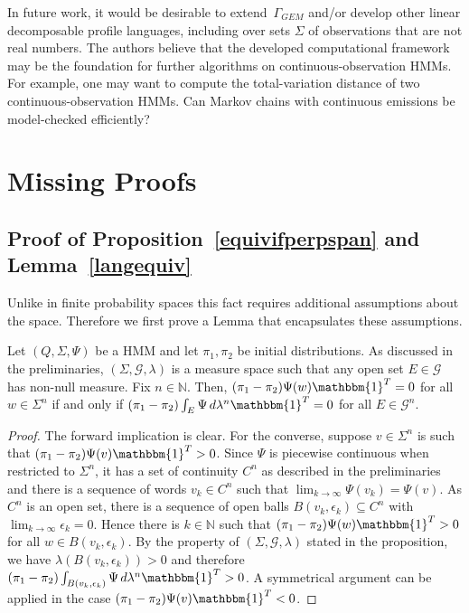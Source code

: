 \documentclass[a4paper,UKenglish,cleveref, autoref,mathscr]{lipics-v2019}
\newcommand{\NN}{\mathbb{N}}
\newcommand{\GG}{\mathscr{G}}
\newcommand{\1}{\mathbbm{1}}
\newcommand{\pl}{\Gamma_{\mathit{GEM}}}
\begin{document}
In future work, it would be desirable to extend~$\pl$ and/or develop other linear decomposable profile languages, including over sets $\Sigma$ of observations that are not real numbers.
The authors believe that the developed computational framework may be the foundation for further algorithms on continuous-observation HMMs.
For example, one may want to compute the total-variation distance of two continuous-observation HMMs.
Can Markov chains with continuous emissions be model-checked efficiently?



\appendix

\section{Missing Proofs}\label{alternants}

\subsection{Proof of Proposition~\ref{equivifperpspan} and Lemma~\ref{langequiv}}

\equivifperpspan*

Unlike in finite probability spaces this fact requires additional assumptions about the space. Therefore we first prove a Lemma that encapsulates these assumptions.

\begin{lemma}\label{pwcontinuousspanlemma}
Let $(Q, \Sigma, \Psi)$ be a HMM and let $\pi_1, \pi_2$ be initial distributions. As discussed in the preliminaries, $(\Sigma, \GG, \lambda)$ is a measure space such that any open set $E \in \GG$ has non-null measure. Fix $n \in \NN$. Then, $(\pi_1 - \pi_2) \Psi(w) \1^T = 0$ for all $w \in \Sigma^n$ if and only if $(\pi_1 - \pi_2)\int_{E} \Psi\,  d\lambda^n \1^T = 0$ for all $E \in \GG^n$.
\end{lemma}

\begin{proof}
The forward implication is clear.
For the converse, suppose $v \in \Sigma^n$ is such that $(\pi_1 - \pi_2) \Psi(v) \1^T > 0$.
Since $\Psi$ is piecewise continuous when restricted to $\Sigma^n$, it has a set of continuity $C^n$ as described in the preliminaries and there is a sequence of words $v_k \in C^n$ such that $\lim_{k \rightarrow \infty} \Psi(v_k) = \Psi(v)$.
As $C^n$ is an open set, there is a sequence of open balls $B(v_k, \epsilon_k) \subseteq C^n$ with $\lim_{k \to \infty} \epsilon_k = 0$.
Hence there is $k \in \NN$ such that $(\pi_1 - \pi_2) \Psi(w) \1^T > 0$ for all $w \in B(v_k, \epsilon_k)$.
By the property of $(\Sigma, \GG, \lambda)$ stated in the proposition, we have $\lambda(B(v_k, \epsilon_k)) > 0$
 and therefore $(\pi_1 - \pi_2) \int_{B(v_k, \epsilon_k)} \Psi\, d\lambda^n \1^T > 0$. A symmetrical argument can be applied in the case $(\pi_1 - \pi_2) \Psi(v) \1^T < 0$.
\end{proof}
\end{document}
